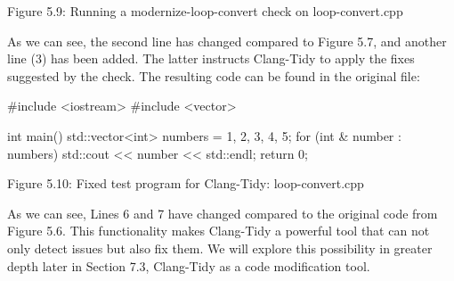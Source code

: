 
\begin{center}
Figure 5.9: Running a modernize-loop-convert check on loop-convert.cpp
\end{center}

As we can see, the second line has changed compared to Figure 5.7, and another line (3) has been added. The latter instructs Clang-Tidy to apply the fixes suggested by the check. The resulting code can be found in the original file:

\begin{cpp}
#include <iostream>
#include <vector>

int main() {
  std::vector<int> numbers = {1, 2, 3, 4, 5};
  for (int & number : numbers) {
    std::cout << number << std::endl;
  }
  return 0;
}
\end{cpp}

\begin{center}
Figure 5.10: Fixed test program for Clang-Tidy: loop-convert.cpp
\end{center}

As we can see, Lines 6 and 7 have changed compared to the original code from Figure 5.6. This functionality makes Clang-Tidy a powerful tool that can not only detect issues but also fix them. We will explore this possibility in greater depth later in Section 7.3, Clang-Tidy as a code modification tool.

